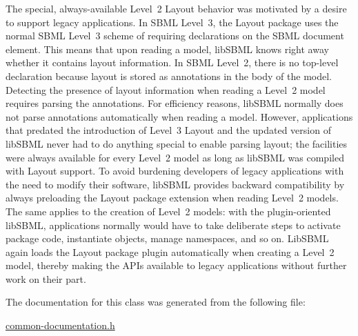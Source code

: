 The special, always-\/available Level~2 Layout behavior was motivated by a desire to support legacy applications. In S\+B\+ML Level~3, the Layout package uses the normal S\+B\+ML Level~3 scheme of requiring declarations on the S\+B\+ML document element. This means that upon reading a model, lib\+S\+B\+ML knows right away whether it contains layout information. In S\+B\+ML Level~2, there is no top-\/level declaration because layout is stored as annotations in the body of the model. Detecting the presence of layout information when reading a Level~2 model requires parsing the annotations. For efficiency reasons, lib\+S\+B\+ML normally does not parse annotations automatically when reading a model. However, applications that predated the introduction of Level~3 Layout and the updated version of lib\+S\+B\+ML never had to do anything special to enable parsing layout; the facilities were always available for every Level~2 model as long as lib\+S\+B\+ML was compiled with Layout support. To avoid burdening developers of legacy applications with the need to modify their software, lib\+S\+B\+ML provides backward compatibility by always preloading the Layout package extension when reading Level~2 models. The same applies to the creation of Level~2 models\+: with the plugin-\/oriented lib\+S\+B\+ML, applications normally would have to take deliberate steps to activate package code, instantiate objects, manage namespaces, and so on. Lib\+S\+B\+ML again loads the Layout package plugin automatically when creating a Level~2 model, thereby making the A\+P\+Is available to legacy applications without further work on their part. 

The documentation for this class was generated from the following file\+:\begin{DoxyCompactItemize}
\item 
\hyperlink{common-documentation_8h}{common-\/documentation.\+h}\end{DoxyCompactItemize}
